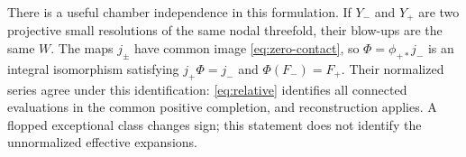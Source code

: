 There is a useful chamber independence in this formulation. If $Y_-$
and $Y_+$ are two projective small resolutions of the same nodal
threefold, their blow-ups are the same $W$. The maps $j_\pm$ have
common image \eqref{eq:zero-contact}, so
$\Phi=\phi_{+*}j_-$ is an integral isomorphism satisfying
$j_+\Phi=j_-$ and $\Phi(F_-)=F_+$. Their normalized series agree
under this identification: \eqref{eq:relative} identifies all
connected evaluations in the common positive completion, and
reconstruction applies. A flopped exceptional class changes sign;
this statement does not identify the unnormalized effective expansions.
